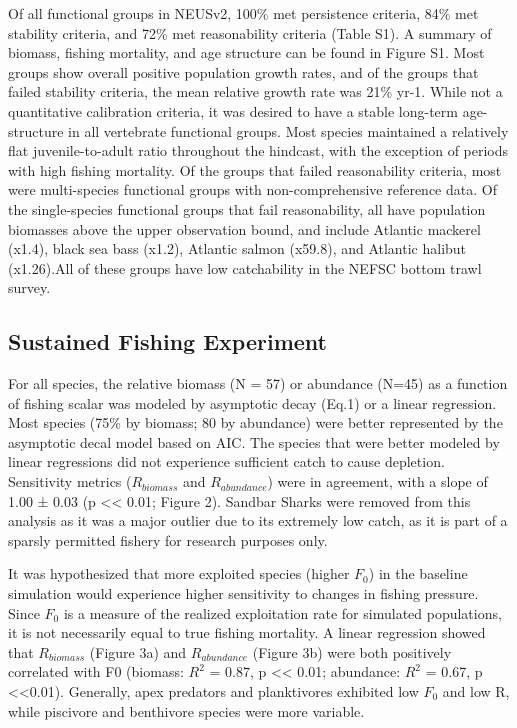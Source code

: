 \documentclass[
]{article}
\begin{document}
Of all functional groups in NEUSv2, 100\% met persistence criteria, 84\% met stability criteria, and 72\% met reasonability criteria (Table S1). A summary of biomass, fishing mortality, and age structure can be found in Figure S1. Most groups show overall positive population growth rates, and of the groups that failed stability criteria, the mean relative growth rate was 21\% yr-1. While not a quantitative calibration criteria, it was desired to have a stable long-term age-structure in all vertebrate functional groups. Most species maintained a relatively flat juvenile-to-adult ratio throughout the hindcast, with the exception of periods with high fishing mortality. Of the groups that failed reasonability criteria, most were multi-species functional groups with non-comprehensive reference data. Of the single-species functional groups that fail reasonability, all have population biomasses above the upper observation bound, and include Atlantic mackerel (x1.4), black sea bass (x1.2), Atlantic salmon (x59.8), and Atlantic halibut (x1.26).All of these groups have low catchability in the NEFSC bottom trawl survey.

\subsection{Sustained Fishing Experiment}\label{sustained-fishing-experiment-1}

For all species, the relative biomass (N = 57) or abundance (N=45) as a function of fishing scalar was modeled by asymptotic decay (Eq.1) or a linear regression. Most species (75\% by biomass; 80 by abundance) were better represented by the asymptotic decal model based on AIC. The species that were better modeled by linear regressions did not experience sufficient catch to cause depletion. Sensitivity metrics (\(R_{biomass}\) and \(R_{abundance}\)) were in agreement, with a slope of 1.00 ± 0.03 (p \textless\textless{} 0.01; Figure 2). Sandbar Sharks were removed from this analysis as it was a major outlier due to its extremely low catch, as it is part of a sparsly permitted fishery for research purposes only.

It was hypothesized that more exploited species (higher \(F_0\)) in the baseline simulation would experience higher sensitivity to changes in fishing pressure. Since \(F_0\) is a measure of the realized exploitation rate for simulated populations, it is not necessarily equal to true fishing mortality. A linear regression showed that \(R_{biomass}\) (Figure 3a) and \(R_{abundance}\) (Figure 3b) were both positively correlated with F0 (biomass: \(R^2\) = 0.87, p \textless\textless{} 0.01; abundance: \(R^2\) = 0.67, p \textless\textless0.01). Generally, apex predators and planktivores exhibited low \(F_0\) and low R, while piscivore and benthivore species were more variable.
\end{document}
